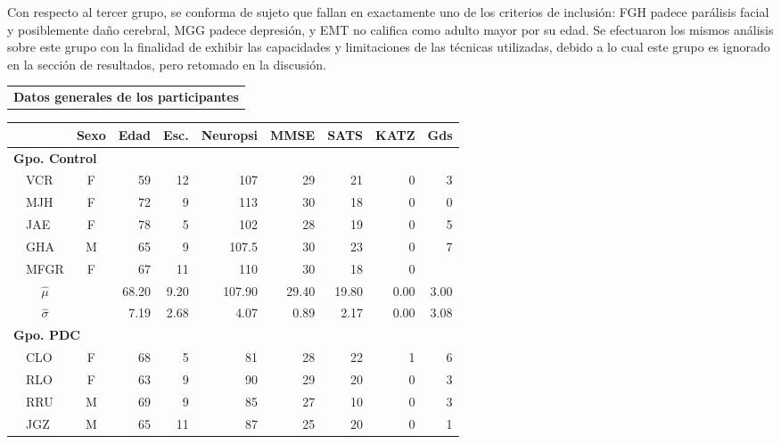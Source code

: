 \documentclass[12pt,a4paper]{mitthesis}
\newcommand{\bordes}[1]{\renewcommand{\arraystretch}{#1}}
\begin{document}
Con respecto al tercer grupo, se conforma de sujeto que
fallan en exactamente uno de los criterios de 
inclusi\'on: FGH padece par\'alisis facial y posiblemente da\~no cerebral, MGG padece depresi\'on, 
y EMT no califica como adulto mayor por su edad.
Se efectuaron los mismos an\'alisis sobre este grupo con la finalidad de exhibir las capacidades y
limitaciones de las t\'ecnicas utilizadas, debido a lo cual este grupo es ignorado en la secci\'on 
de resultados, pero retomado en la discusi\'on.

\begin{table}
\centering
\bordes{1.1}
\begin{tabular}{c}
\textbf{Datos generales de los participantes}
\vspace{1em}
\end{tabular}
\begin{small}
\begin{tabular}{llcrrrrrrr}
\toprule
 \phantom{mm}&
 & \textbf{Sexo} & \textbf{Edad} & \textbf{Esc.} & \textbf{Neuropsi} & \textbf{MMSE} & \textbf{SATS} & \textbf{KATZ} & \textbf{Gds} \\
\midrule
\multicolumn{6}{l}{\textbf{Gpo. Control}}\\
&VCR    & F    & 59   & 12   & 107      & 29   & 21   & 0    & 3 \\
&MJH    & F    & 72   & 9    & 113      & 30   & 18   & 0    & 0 \\
&JAE    & F    & 78   & 5    & 102      & 28   & 19   & 0    & 5 \\
&GHA    & M    & 65   & 9    & 107.5    & 30   & 23   & 0    & 7 \\
&MFGR   & F    & 67   & 11   & 110      & 30   & 18   & 0    &   \\
\rowcolor{gris}
&\multicolumn{1}{c}{$\widehat{\mu}$} & 
              & 68.20& 9.20 & 107.90   & 29.40& 19.80& 0.00 & 3.00\\
\rowcolor{gris}
&\multicolumn{1}{c}{$\widehat{\sigma}$} & 
              & 7.19 & 2.68 & 4.07     & 0.89 & 2.17 & 0.00 & 3.08\\
\midrule
\multicolumn{6}{l}{\textbf{Gpo. PDC}}\\
&CLO    & F    & 68   & 5    & 81       & 28   & 22   & 1    & 6 \\
&RLO    & F    & 63   & 9    & 90       & 29   & 20   & 0    & 3 \\
&RRU    & M    & 69   & 9    & 85       & 27   & 10   & 0    & 3 \\
&JGZ    & M    & 65   & 11   & 87       & 25   & 20   & 0    & 1 \\

\end{tabular}
\end{small}
\end{table}
\end{document}
